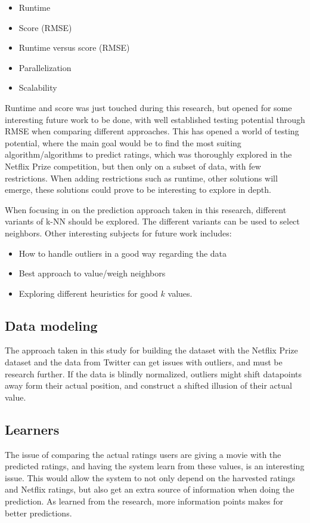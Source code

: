 \begin{itemize}
    \item Runtime
    \item Score (RMSE)
    \item Runtime versus score (RMSE)
    \item Parallelization
    \item Scalability
\end{itemize}

Runtime and score was just touched during this research, but opened for some interesting future work to be done, with well established testing potential through RMSE when comparing different approaches. This has opened a world of testing potential, where the main goal would be to find the most suiting algorithm/algorithms to predict ratings, which was thoroughly explored in the Netflix Prize competition, but then only on a subset of data, with few restrictions. When adding restrictions such as runtime, other solutions will emerge, these solutions could prove to be interesting to explore in depth.

When focusing in on the prediction approach taken in this research, different variants of k-NN should be explored. The different variants can be used to select neighbors. Other interesting subjects for future work includes:

\begin{itemize}
    \item How to handle outliers in a good way regarding the data
    \item Best approach to value/weigh neighbors
    \item Exploring different heuristics for good $k$ values.
\end{itemize}



\subsection{Data modeling}
The approach taken in this study for building the dataset with the Netflix Prize dataset and the data from Twitter can get issues with outliers, and must be research further. If the data is blindly normalized, outliers might shift datapoints away form their actual position, and construct a shifted illusion of their actual value.


\subsection{Learners}
The issue of comparing the actual ratings users are giving a movie with the predicted ratings, and having the system learn from these values, is an interesting issue. This would allow the system to not only depend on the harvested ratings and Netflix ratings, but also get an extra source of information when doing the prediction. As learned from the research, more information points makes for better predictions.

